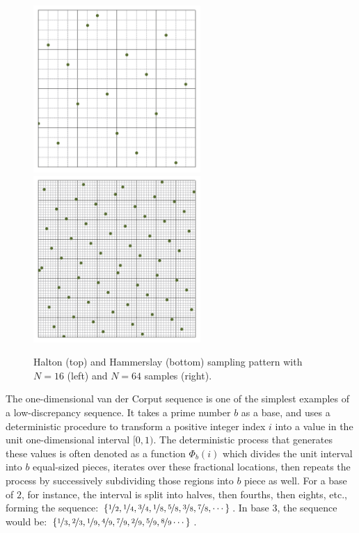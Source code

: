 \documentclass[11pt,fleqn]{book} %
\begin{document}
\begin{figure}[!h]
      \includegraphics[width=2.5in]{Pictures/pointset-gridvisualize/points-hammerslay-n16.pdf}
    \includegraphics[width=2.5in]{./Pictures/pointset-gridvisualize/points-hammerslay-n64.pdf}
  \caption{Halton (top) and Hammerslay (bottom) sampling pattern with $N=16$ (left) and $N = 64$ samples (right).}
  \label{fig:deterministic}
\end{figure}
%

The one-dimensional van der Corput sequence is one of the simplest examples of a low-discrepancy sequence. It takes a prime number $b$ as a base, and uses a deterministic procedure to transform a positive integer index $i$ into a value in the unit one-dimensional interval $[0,1)$. The deterministic process that generates these values is often denoted as a function $\Phi_b(i)$ which divides the unit interval into $b$ equal-sized pieces, iterates over these fractional locations, then repeats the process by successively subdividing those regions into $b$ piece as well. For a base of $2$, for instance, the interval is split into halves, then fourths, then eights, etc., forming the sequence:
%
$\left\{\nicefrac{1}{2}, \nicefrac{1}{4}, \nicefrac{3}{4}, \nicefrac{1}{8}, \nicefrac{5}{8}, \nicefrac{3}{8}, \nicefrac{7}{8}, \cdots \right\}$.
%
In base $3$, the sequence would be:
%
$\left\{\nicefrac{1}{3}, \nicefrac{2}{3}, \nicefrac{1}{9}, \nicefrac{4}{9}, \nicefrac{7}{9}, \nicefrac{2}{9}, \nicefrac{5}{9}, \nicefrac{8}{9}\cdots \right\}$.
%
\end{document}
